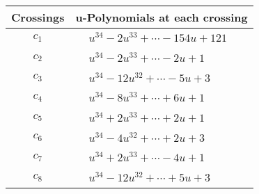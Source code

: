 \documentclass[1p]{elsarticle_modified}
\theoremstyle{definition}
\begin{document}
\begin{tabular}{m{50pt}|m{274pt}}
Crossings & \hspace{64pt}u-Polynomials at each crossing \\
\hline $$\begin{aligned}c_{1}\end{aligned}$$&$\begin{aligned}
&u^{34}-2 u^{33}+\cdots-154 u+121
\end{aligned}$\\
\hline $$\begin{aligned}c_{2}\end{aligned}$$&$\begin{aligned}
&u^{34}-2 u^{33}+\cdots-2 u+1
\end{aligned}$\\
\hline $$\begin{aligned}c_{3}\end{aligned}$$&$\begin{aligned}
&u^{34}-12 u^{32}+\cdots-5 u+3
\end{aligned}$\\
\hline $$\begin{aligned}c_{4}\end{aligned}$$&$\begin{aligned}
&u^{34}-8 u^{33}+\cdots+6 u+1
\end{aligned}$\\
\hline $$\begin{aligned}c_{5}\end{aligned}$$&$\begin{aligned}
&u^{34}+2 u^{33}+\cdots+2 u+1
\end{aligned}$\\
\hline $$\begin{aligned}c_{6}\end{aligned}$$&$\begin{aligned}
&u^{34}-4 u^{32}+\cdots+2 u+3
\end{aligned}$\\
\hline $$\begin{aligned}c_{7}\end{aligned}$$&$\begin{aligned}
&u^{34}+2 u^{33}+\cdots-4 u+1
\end{aligned}$\\
\hline $$\begin{aligned}c_{8}\end{aligned}$$&$\begin{aligned}
&u^{34}-12 u^{32}+\cdots+5 u+3
\end{aligned}$\\

\end{tabular}
\end{document}
